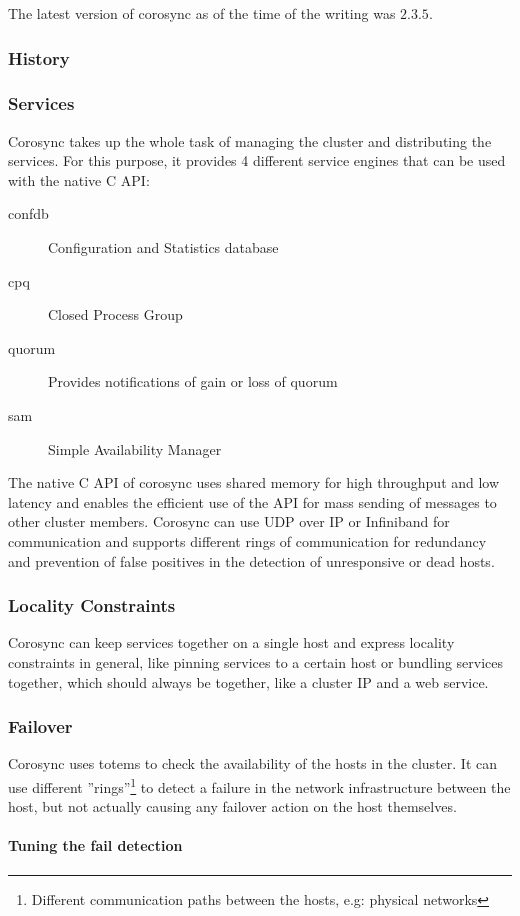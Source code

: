 The latest version of corosync as of the time of the writing was $2.3.5$.
\subsubsection{History}
\subsubsection{Services}
Corosync takes up the whole task of managing the cluster and distributing the services. For this purpose, it provides 4 different service engines that can be used with the native C \ac{API}:
\begin{description}
\item [confdb] Configuration and Statistics database
\item [cpq] Closed Process Group
\item [quorum] Provides notifications of gain or loss of quorum
\item [sam] Simple Availability Manager
\end{description}
The native C API of corosync uses shared memory for high throughput and low 
latency and enables the efficient use of the API for mass sending of messages to 
other cluster members.
\linebreak[3]
Corosync can use UDP over IP or Infiniband for communication and supports different 
rings of communication for redundancy and prevention of false positives in the 
detection of unresponsive or dead hosts.
\subsubsection{Locality Constraints}
Corosync can keep services together on a single host and express locality constraints in general,
like pinning services to a certain host or bundling services together, which should
always be together, like a cluster IP and a web service.
\subsubsection{Failover}
Corosync uses totems\cite{Amir95thetotem} to check the availability of the hosts
in the cluster. It can use different ''rings''\footnote{Different communication
paths between the hosts, e.g: physical networks} to detect a failure
in the network infrastructure between the host, but not actually causing any failover
action on the host themselves.
\paragraph{Tuning the fail detection}

